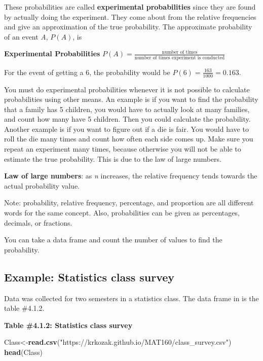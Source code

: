 \documentclass[]{book}
\newenvironment{Shaded}{\begin{snugshade}}{\end{snugshade}}
\newcommand{\KeywordTok}[1]{\textcolor[rgb]{0.13,0.29,0.53}{\textbf{#1}}}
\newcommand{\NormalTok}[1]{#1}
\newcommand{\StringTok}[1]{\textcolor[rgb]{0.31,0.60,0.02}{#1}}
\begin{document}
These probabilities are called \textbf{experimental probabilities} since they
are found by actually doing the experiment. They come about from the
relative frequencies and give an approximation of the true probability.
The approximate probability of an event \emph{A}, \(P(A)\), is

\textbf{Experimental Probabilities}
\(P(A)=\frac{\text{number of times} }{ \text{number of times experiment is conducted}}\)

For the event of getting a 6, the probability would be \(P(6)=\frac{163}{1000}=0.163\).

You must do experimental probabilities whenever it is not possible to
calculate probabilities using other means. An example is if you want to
find the probability that a family has 5 children, you would have to
actually look at many families, and count how many have 5 children. Then
you could calculate the probability. Another example is if you want to
figure out if a die is fair. You would have to roll the die many times
and count how often each side comes up. Make sure you repeat an
experiment many times, because otherwise you will not be able to
estimate the true probability. This is due to the law of large numbers.

\textbf{Law of large numbers}: as \emph{n} increases, the relative frequency tends
towards the actual probability value.

Note: probability, relative frequency, percentage, and proportion are all different words for the same concept. Also, probabilities can be given as percentages, decimals, or fractions.

You can take a data frame and count the number of values to find the probability.

\hypertarget{example-statistics-class-survey}{%
\subsection{Example: Statistics class survey}\label{example-statistics-class-survey}}

Data was collected for two semesters in a statistics class. The data frame in is the table \#4.1.2.

\textbf{Table \#4.1.2: Statistics class survey}

\begin{Shaded}
\begin{Highlighting}[]
\NormalTok{Class<-}\KeywordTok{read.csv}\NormalTok{(}\StringTok{"https://krkozak.github.io/MAT160/class_survey.csv"}\NormalTok{)}
\KeywordTok{head}\NormalTok{(Class)}
\end{Highlighting}
\end{Shaded}
\end{document}
